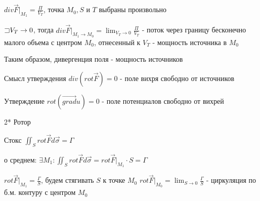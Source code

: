\documentclass[12pt]{article}
\begin{document}
    $div \overrightarrow{F} \Big|_{M_1} = \frac{\Pi}{V_T}$, точка $M_0, S$ и $T$ выбраны произвольно

    $\mathord{\sqsupset} V_T \to 0$, тогда $div \overrightarrow{F} \Big|_{M_1 \to M_0} = \lim_{V_T \to 0} \frac{\Pi}{V_T}$ - поток через границу бесконечно малого объема с центром $M_0$, отнесенный к $V_T$ - мощность источника в $M_0$

    Таким образом, дивергенция поля - мощность источников

    \Nota Смысл утверждения $div (rot \overrightarrow F) = 0$ - поле вихря свободно от источников

    \Nota Утверждение $rot (\overrightarrow{grad} u) = 0$ - поле потенциалов свободно от вихрей

    \mediumvspace

    \hypertarget{rotormechanicalmeaning}{}

    2* Ротор

    Стокс $\iint_S rot \overrightarrow{F} d\overrightarrow{\sigma} = \Gamma$

    \Ths о среднем: $\exists M_1 : \iint_S rot \overrightarrow{F} d\overrightarrow{\sigma} = rot \overrightarrow{F} \Big|_{M_1} \cdot S = \Gamma$

    $rot \overrightarrow{F} \Big|_{M_1} = \frac{\Gamma}{S}$, будем стягивать $S$ к точке $M_0$ \Longrightarrow $rot \overrightarrow{F} \Big|_{M_0} = \lim_{S \to 0} \frac{\Gamma}{S}$ - циркуляция по б.м. контуру с центром $M_0$
\end{document}
